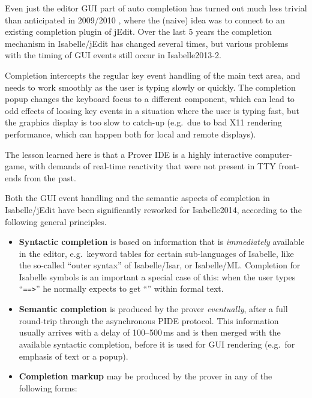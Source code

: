 \begin{isabellebody}
\begin{isamarkuptext}
Even just the editor GUI part of auto completion has turned out much less
trivial than anticipated in 2009/2010 \cite{Wenzel:2010}, where the (naive)
idea was to connect to an existing completion plugin of jEdit. Over the last
5 years the completion mechanism in Isabelle/jEdit has changed several
times, but various problems with the timing of GUI events still occur in
Isabelle2013-2.

Completion intercepts the regular key event handling of the main text area,
and needs to work smoothly as the user is typing slowly or quickly. The
completion popup changes the keyboard focus to a different component, which
can lead to odd effects of loosing key events in a situation where the user
is typing fast, but the graphics display is too slow to catch-up (e.g.\ due
to bad X11 rendering performance, which can happen both for local and remote
displays).

The lesson learned here is that a Prover IDE is a highly interactive
computer-game, with demands of real-time reactivity that were not present in
TTY front-ends from the past.

\medskip Both the GUI event handling and the semantic aspects of completion
in Isabelle/jEdit have been significantly reworked for Isabelle2014,
according to the following general principles.

\begin{itemize}

\item \textbf{Syntactic completion} is based on information that is
\emph{immediately} available in the editor, e.g.\ keyword tables for certain
sub-languages of Isabelle, like the so-called ``outer syntax'' of
Isabelle/Isar, or Isabelle/ML. Completion for Isabelle symbols is an
important a special case of this: when the user types ``\verb|==>|''
he normally expects to get ``\isa{{\isasymLongrightarrow}}'' within formal text.

\item \textbf{Semantic completion} is produced by the prover
\emph{eventually}, after a full round-trip through the asynchronous PIDE
protocol. This information usually arrives with a delay of 100--500\,ms and
is then merged with the available syntactic completion, before it is used
for GUI rendering (e.g.\ for emphasis of text or a popup).

\item \textbf{Completion markup} may be produced by the prover in any of the
following forms:

\begin{itemize}


\end{itemize}
\end{itemize}
\end{isamarkuptext}
\end{isabellebody}
